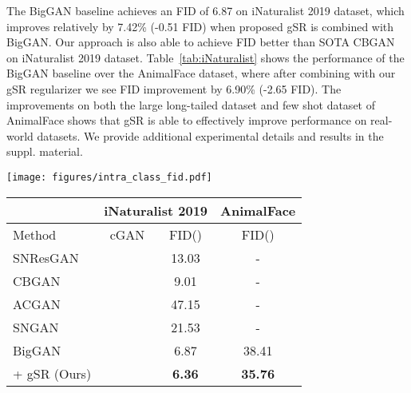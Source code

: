 \documentclass[runningheads,table]{llncs}
\newcommand{\cmark}{\color{green}{\ding{51}}}\newcommand{\xmark}{\color{red}{\ding{55}}}\newcommand{\etal}{\textit{et al}.}
\begin{document}
The BigGAN baseline achieves an FID of 6.87 on iNaturalist 2019 dataset, which improves relatively by 7.42\% (-0.51 FID) when proposed gSR is combined with BigGAN. Our approach is also able to achieve FID better than SOTA CBGAN on iNaturalist 2019 dataset.
\mbox{Table~\ref{tab:iNaturalist}} shows the performance of the BigGAN baseline over the AnimalFace dataset, where after combining with our gSR regularizer we see FID improvement by 6.90\% (-2.65 FID). The improvements on both the large long-tailed dataset and few shot dataset of AnimalFace shows that gSR is able to effectively improve performance on real-world datasets. We provide additional experimental details and results in the suppl. material.
\setlength{\intextsep}{0pt}\begin{figure*}[t]
  \centering
\begin{minipage}[c]{0.34\linewidth}
    \centering
    \texttt{[image: figures/intra\_class\_fid.pdf]}
    \label{fig:intra-fid}
  \end{minipage}
   \hfill
  \begin{minipage}[c]{0.60\textwidth}
    \centering
    \label{tab:iNaturalist}
    \begin{tabular}{l|c|c|c}
    \toprule
                & \multicolumn{2}{c}{iNaturalist 2019} & AnimalFace \\ \hline
         Method & cGAN & FID() & FID()\\ \midrule
         SNResGAN~\cite{miyato2018spectral}& \xmark & 13.03 & -\\
         CBGAN~\cite{rangwani2021class} & \xmark & 9.01 & - \\ 
         ACGAN~\cite{odena2017conditional} & \cmark & 47.15 & - \\
         SNGAN~\cite{miyato2018cgans} & \cmark & 
         21.53 & -\\  \midrule
         
         BigGAN~\cite{brock2018large} & \cmark & 6.87 & 38.41\\
        \rowcolor{gray!10} \; + gSR (Ours) & \cmark&\textbf{6.36} & \textbf{35.76} \\ \bottomrule
    \end{tabular}
  \end{minipage}
\end{figure*}
\end{document}
